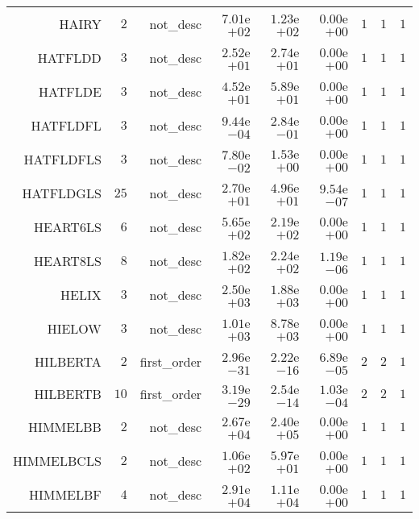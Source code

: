 \begin{longtable}{rrrrrrrrr}
HAIRY & \(     2\) & not\_desc & \( 7.01\)e\(+02\) & \( 1.23\)e\(+02\) & \( 0.00\)e\(+00\) & \(     1\) & \(     1\) & \(     1\) \\
HATFLDD & \(     3\) & not\_desc & \( 2.52\)e\(+01\) & \( 2.74\)e\(+01\) & \( 0.00\)e\(+00\) & \(     1\) & \(     1\) & \(     1\) \\
HATFLDE & \(     3\) & not\_desc & \( 4.52\)e\(+01\) & \( 5.89\)e\(+01\) & \( 0.00\)e\(+00\) & \(     1\) & \(     1\) & \(     1\) \\
HATFLDFL & \(     3\) & not\_desc & \( 9.44\)e\(-04\) & \( 2.84\)e\(-01\) & \( 0.00\)e\(+00\) & \(     1\) & \(     1\) & \(     1\) \\
HATFLDFLS & \(     3\) & not\_desc & \( 7.80\)e\(-02\) & \( 1.53\)e\(+00\) & \( 0.00\)e\(+00\) & \(     1\) & \(     1\) & \(     1\) \\
HATFLDGLS & \(    25\) & not\_desc & \( 2.70\)e\(+01\) & \( 4.96\)e\(+01\) & \( 9.54\)e\(-07\) & \(     1\) & \(     1\) & \(     1\) \\
HEART6LS & \(     6\) & not\_desc & \( 5.65\)e\(+02\) & \( 2.19\)e\(+02\) & \( 0.00\)e\(+00\) & \(     1\) & \(     1\) & \(     1\) \\
HEART8LS & \(     8\) & not\_desc & \( 1.82\)e\(+02\) & \( 2.24\)e\(+02\) & \( 1.19\)e\(-06\) & \(     1\) & \(     1\) & \(     1\) \\
HELIX & \(     3\) & not\_desc & \( 2.50\)e\(+03\) & \( 1.88\)e\(+03\) & \( 0.00\)e\(+00\) & \(     1\) & \(     1\) & \(     1\) \\
HIELOW & \(     3\) & not\_desc & \( 1.01\)e\(+03\) & \( 8.78\)e\(+03\) & \( 0.00\)e\(+00\) & \(     1\) & \(     1\) & \(     1\) \\
HILBERTA & \(     2\) & first\_order & \( 2.96\)e\(-31\) & \( 2.22\)e\(-16\) & \( 6.89\)e\(-05\) & \(     2\) & \(     2\) & \(     1\) \\
HILBERTB & \(    10\) & first\_order & \( 3.19\)e\(-29\) & \( 2.54\)e\(-14\) & \( 1.03\)e\(-04\) & \(     2\) & \(     2\) & \(     1\) \\
HIMMELBB & \(     2\) & not\_desc & \( 2.67\)e\(+04\) & \( 2.40\)e\(+05\) & \( 0.00\)e\(+00\) & \(     1\) & \(     1\) & \(     1\) \\
HIMMELBCLS & \(     2\) & not\_desc & \( 1.06\)e\(+02\) & \( 5.97\)e\(+01\) & \( 0.00\)e\(+00\) & \(     1\) & \(     1\) & \(     1\) \\
HIMMELBF & \(     4\) & not\_desc & \( 2.91\)e\(+04\) & \( 1.11\)e\(+04\) & \( 0.00\)e\(+00\) & \(     1\) & \(     1\) & \(     1\) \\

\end{longtable}
